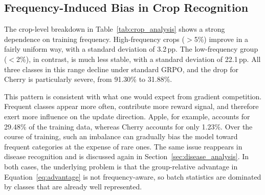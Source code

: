 \documentclass[sigconf,anonymous,review]{acmart}
\begin{document}



\subsection{Frequency-Induced Bias in Crop Recognition}
\label{sec:bias_analysis}

The crop-level breakdown in Table~\ref{tab:crop_analysis} shows a strong dependence on training frequency. High-frequency crops ($>$5\%) improve in a fairly uniform way, with a standard deviation of 3.2\,pp. The low-frequency group ($<$2\%), in contrast, is much less stable, with a standard deviation of 22.1\,pp. All three classes in this range decline under standard GRPO, and the drop for Cherry is particularly severe, from 91.30\% to 31.88\%.

This pattern is consistent with what one would expect from gradient competition. Frequent classes appear more often, contribute more reward signal, and therefore exert more influence on the update direction. Apple, for example, accounts for 29.48\% of the training data, whereas Cherry accounts for only 1.23\%. Over the course of training, such an imbalance can gradually bias the model toward frequent categories at the expense of rare ones. The same issue reappears in disease recognition and is discussed again in Section~\ref{sec:disease_analysis}. In both cases, the underlying problem is that the group-relative advantage in Equation~\ref{eq:advantage} is not frequency-aware, so batch statistics are dominated by classes that are already well represented.
\end{document}
